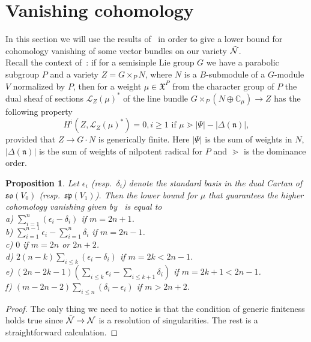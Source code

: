 \documentclass[12pt]{amsart}
\newtheorem{prop}[thm]{Proposition}
\theoremstyle{definition}
\theoremstyle{remark}
\numberwithin{equation}{subsection}
\begin{document}
\section{Vanishing cohomology}
\label{sec4}
In this section we will use the results of~\cite{DP} in order to give a lower bound for cohomology vanishing of some vector bundles on our variety $\Tilde{\mathcal{N}}$.\\
Recall the context of~\cite[Theorem 3.1]{DP}: if for a semisinple Lie group $G$ we have a parabolic subgroup $P$ and a variety $Z=G \times_P N$, where $N$ is a $B$-submodule of a $G$-module $V$ normalized by $P$, then for a weight $\mu \in \mathfrak{X}^P$ from the character group of $P$ the dual sheaf of sections $\mathcal{L}_Z(\mu)^*$ of the line bundle $G\times_P (N \oplus \mathbb{C}_{\mu}) \rightarrow Z$ has the following property
\begin{equation}
    H^i(Z,\mathcal{L}_Z(\mu)^*)=0, i\ge 1 \text{ if } \mu \gtrdot |\Psi|-|\Delta(\mathfrak{n})|,
\end{equation}
provided that $Z\rightarrow G\cdot N$ is generically finite. Here $|\Psi|$ is the sum of weights in $N$, $|\Delta(\mathfrak{n})|$ is the sum of weights of nilpotent radical for $P$ and $\gtrdot$ is the dominance order.
\begin{prop}
  \label{prop4}
  Let $\epsilon_i$ (resp.\ $\delta_i$) denote the standard basis in the dual Cartan of
  $\mathfrak{so}(V_0)$ (resp.\ $\mathfrak{sp}(V_1)$). Then the lower bound for $\mu$ that
  guarantees the higher cohomology vanishing given
  by~\cite[Theorem 3.1]{DP} is equal to\\
a) $\sum_{i=1}^n (\epsilon_i-\delta_i)$ if $m=2n+1$.\\
b) $\sum_{i=1}^{n-1}\epsilon_i-\sum_{i=1}^n \delta_i$ if $m=2n-1$.\\
c) $0$ if $m=2n$ or $2n+2$.\\
d) $2(n-k)\sum_{i\le k} (\epsilon_i -\delta_i)$ if $m=2k<2n-1$.\\
e) $(2n-2k-1)(\sum_{i\le k}\epsilon_i - \sum_{i\le k+1}\delta_i)$ if $m=2k+1<2n-1$.\\
f) $(m-2n-2)\sum_{i\le n}(\delta_i-\epsilon_i)$ if $m > 2n+2$.
\end{prop}
\begin{proof}
  The only thing we need to notice is that the condition of generic finiteness holds true since $\Tilde{\mathcal{N}} \rightarrow \mathcal{N}$ is a resolution of singularities. The rest is a straightforward calculation.  
\end{proof}
\end{document}
